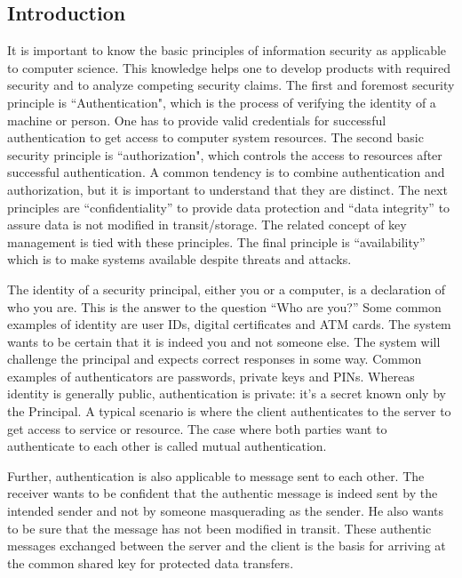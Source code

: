 \begin{multicols}{2}
\section*{Introduction}

It is important to know the basic principles of information security as applicable to computer science. This knowledge helps one to develop products with required security and to analyze competing security claims. The first and foremost security principle is ``Authentication", which is the process of verifying the identity of a machine or person. One has to provide valid credentials for successful authentication to get access to computer system resources. The second basic security principle is ``authorization", which controls the access to resources after successful authentication. A common tendency is to combine authentication and authorization, but it is important to understand that they are distinct. The next principles are ``confidentiality'' to provide data protection and ``data integrity'' to assure data is not modified in transit/storage. The related concept of key management is tied with these principles. The final principle is ``availability'' which is to make systems available despite threats and attacks.

The identity of a security principal, either you or a computer, is a declaration of who you are. This is the answer to the question ``Who are you?'' Some common examples of identity are user IDs, digital certificates and ATM cards. The system wants to be certain that it is indeed you and not someone else. The system will challenge the principal and expects correct responses in some way. Common examples of authenticators are passwords, private keys and PINs. Whereas identity is generally public, authentication is private: it's a secret known only by the Principal. A typical scenario is where the client authenticates to the server to get access to service or resource. The case where both parties want to authenticate to each other is called mutual authentication. 

Further, authentication is also applicable to message sent to each other. The receiver wants to be confident that the authentic message is indeed sent by the intended sender and not by someone masquerading as the sender. He also wants to be sure that the message has not been modified in transit. These authentic messages exchanged between the server and the client is the basis for arriving at the common shared key for protected data transfers.


\end{multicols}
